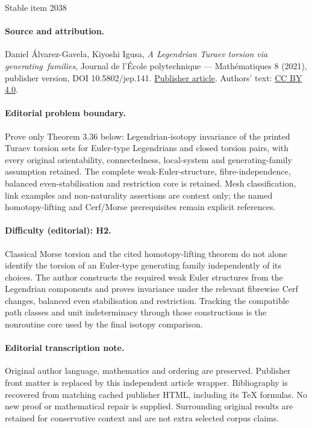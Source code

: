 \documentclass[11pt]{article}
\numberwithin{equation}{section}\providecommand{\dpl}{\displaystyle}
\theoremstyle{plain}
\theoremstyle{definition}
\begin{document}
\begin{center}{\Large Stable item 2038}\end{center}
\paragraph{Source and attribution.}
Daniel Álvarez-Gavela, Kiyoshi Igusa, \emph{A Legendrian Turaev torsion via generating families}, Journal de l’École polytechnique — Mathématiques 8 (2021), publisher version, DOI 10.5802/jep.141. \href{https://jep.centre-mersenne.org/articles/10.5802/jep.141/}{Publisher article}. Authors' text: \href{https://creativecommons.org/licenses/by/4.0/}{CC BY 4.0}.
\paragraph{Editorial problem boundary.}
Prove only Theorem 3.36 below: Legendrian-isotopy invariance of the printed Turaev torsion sets for Euler-type Legendrians and closed torsion pairs, with every original orientability, connectedness, local-system and generating-family assumption retained. The complete weak-Euler-structure, fibre-independence, balanced even-stabilisation and restriction core is retained. Mesh classification, link examples and non-naturality assertions are context only; the named homotopy-lifting and Cerf/Morse prerequisites remain explicit references.
\paragraph{Difficulty (editorial): H2.}
Classical Morse torsion and the cited homotopy-lifting theorem do not alone identify the torsion of an Euler-type generating family independently of its choices. The author constructs the required weak Euler structures from the Legendrian components and proves invariance under the relevant fibrewise Cerf changes, balanced even stabilisation and restriction. Tracking the compatible path classes and unit indeterminacy through those constructions is the nonroutine core used by the final isotopy comparison.
\paragraph{Editorial transcription note.}
Original author language, mathematics and ordering are preserved. Publisher front matter is replaced by this independent article wrapper. Bibliography is recovered from matching cached publisher HTML, including its TeX formulas. No new proof or mathematical repair is supplied. Surrounding original results are retained for conservative context and are not extra selected corpus claims.
\clearpage
\end{document}
